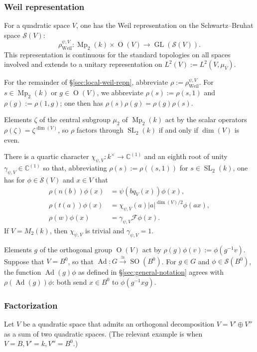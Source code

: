 \documentclass[reqno,10pt]{amsart}
\theoremstyle{plain} %
\theoremstyle{definition}
\theoremstyle{plain} %
\theoremstyle{remark}
\theoremstyle{itplain} %
\theoremstyle{remark} %
\numberwithin{equation}{section}
\DeclareMathOperator{\SL}{SL}
\DeclareMathOperator{\Mp}{Mp}
\DeclareMathOperator{\GL}{GL}
\DeclareMathOperator{\SO}{SO}
\DeclareMathOperator{\Ad}{Ad}
\DeclareMathOperator{\Weil}{Weil}
\def\O{\operatorname{O}}
\begin{document}
\subsubsection{Weil representation\label{sec:local-weil-repn}}
\label{sec-2-2-3}
For a quadratic space $V$, one has the Weil representation \cite{MR0165033} on the Schwartz--Bruhat space $\mathcal{S}(V)$:
\[\rho_{\Weil}^{\psi,V} : \Mp_2(k)
  \times \O(V) \rightarrow \GL(\mathcal{S}(V)).\] This representation is continuous \cite[\S39]{MR0165033} for the standard topologies on all spaces involved and extends to a unitary representation on $L^2(V) := L^2(V,\mu_V)$.

For the remainder of \S\ref{sec:local-weil-repn}, abbreviate $\rho := \rho_{\Weil}^{\psi,V}$.  For $s \in \Mp_2(k)$ or $g \in \O(V)$, we abbreviate $\rho(s) := \rho(s,1)$ and $\rho(g) := \rho(1,g)$; one then has $\rho(s) \rho(g) = \rho(g) \rho(s)$.

Elements $\zeta$ of the central subgroup $\mu_2$ of $\Mp_2(k)$ act by the scalar operators $\rho(\zeta) = \zeta^{\dim(V)}$, so $\rho$ factors through $\SL_2(k)$ if and only if $\dim(V)$ is even.

There is a quartic character $\chi_{\psi,V} : k^\times \rightarrow \mathbb{C}^{(1)}$ and an eighth root of unity $\gamma_{\psi,V} \in \mathbb{C}^{(1)}$ so that, abbreviating $\rho(s) := \rho( (s,1))$ for $s \in \SL_2(k)$, one has for $\phi \in \mathcal{S}(V)$ and $x \in V$ that
\begin{align*}
  \rho(n(b))
  \phi(x)
  &= 
    \psi(b q_V(x)) \phi(x),
  \\
  \rho(t(a))
  \phi(x)
  &= 
    \chi_{\psi,V}(a) |a|^{\dim(V)/2} \phi(a x),
  \\
  \rho(w) \phi(x)
  &=
    \gamma_{\psi,V} \mathcal{F} \phi(x).
\end{align*}
If $V = M_2(k)$, then $\chi_{\psi,V}$ is trivial and $\gamma_{\psi,V} = 1$.





Elements $g$ of the orthogonal group $\O(V)$ act by $\rho(g) \phi(v) := \phi(g^{-1} v)$.  Suppose that $V = B^0$, so that $\Ad : G \xrightarrow{\cong} \SO(B^0)$.  For $g \in G$ and $\phi \in \mathcal{S}(B^0)$, the function $\Ad(g) \phi$ as defined in \S\ref{sec:general-notation} agrees with $\rho(\Ad(g)) \phi$: both send $x \in B^0$ to $\phi(g^{-1} x g)$.
\subsubsection{Factorization\label{sec:factorization-weil-repn}}
\label{sec-2-2-4}
Let $V$ be a quadratic space that admits an orthogonal decomposition $V = V' \oplus V''$ as a sum of two quadratic spaces.  (The relevant example is when $V = B, V' = k, V'' = B^0$.)
\end{document}
